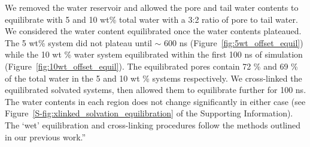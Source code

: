 \documentclass{article}
\begin{document}
\begin{enumerate}
    We removed the water reservoir and allowed the pore and tail water
    contents to equilibrate with 5 and 10 wt\% total water with a 3:2 ratio
    of pore to tail water. We considered the water content
    equilibrated once the water contents plateaued. The 5 wt\% system did
    not plateau until $\sim$ 600 ns (Figure~\ref{fig:5wt_offset_equil})
    while the 10 wt \% water system equilibrated within the first 100 ns of 
    simulation (Figure~\ref{fig:10wt_offset_equil}).
    The equilibrated pores contain 72 \% and 69 \% of the total water in the
    5 and 10 wt \% systems respectively. We cross-linked the equilibrated 
    solvated systems, then allowed them to equilibrate further for 100 ns. 
    The water contents in each region does not change significantly in either case 
    (see Figure~\ref{S-fig:xlinked_solvation_equilibration} of the Supporting Information).
    The `wet' equilibration and cross-linking procedures follow
    the methods outlined in our previous work.''

\end{enumerate}
\end{document}
